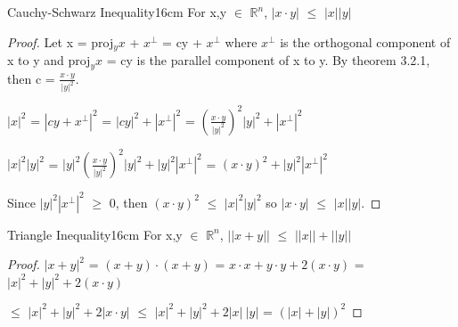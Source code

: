     \vspace{0.5cm}



    \begin{wtheorem}{Cauchy-Schwarz Inequality}{16cm}
        For x,y $\in$ $\mathbb{R}^n$,
        $|x \cdot y|$ $\leq$ $|x| |y|$
    \end{wtheorem}

    \begin{proof}
        Let x = proj$_yx$ + $x^{\perp}$ = cy + $x^{\perp}$
        where $x^{\perp}$ is the orthogonal component of x to y and
        proj$_yx$ = cy is the parallel component of x to y.
        By {\color{red} theorem 3.2.1}, then c = $\frac{x \cdot y}{|y|^2}$.

        \hspace{0.5cm}
        $|x|^2$
        = $|cy+x^{\perp}|^2$
        = $|cy|^2 + |x^{\perp}|^2$
        = $(\frac{x \cdot y}{|y|^2})^2 |y|^2 + |x^{\perp}|^2$

        \hspace{0.5cm}
        $|x|^2 |y|^2$
        = $|y|^2(\frac{x \cdot y}{|y|^2})^2 |y|^2 + |y|^2 |x^{\perp}|^2$
        = $(x \cdot y)^2 + |y|^2 |x^{\perp}|^2$

        Since $|y|^2 |x^{\perp}|^2$ $\geq$ 0, then
        $(x \cdot y)^2$ $\leq$ $|x|^2 |y|^2$
        so $|x \cdot y|$ $\leq$ $|x| |y|$.
    \end{proof}

    \vspace{0.5cm}



    \begin{corollary}{Triangle Inequality}{16cm}
        For x,y $\in$ $\mathbb{R}^n$,
        $||x+y||$ $\leq$ $||x|| + ||y||$
    \end{corollary}

    \begin{proof}
        $|x+y|^2$
        = $(x+y) \cdot (x+y)$
        = $x \cdot x + y \cdot y + 2(x \cdot y)$
        = $|x|^2 + |y|^2 +2(x \cdot y)$

        \hspace{1.35cm}
        $\leq$ $|x|^2 + |y|^2 +2|x \cdot y|$
        $\leq$ $|x|^2 + |y|^2 +2|x| \ |y|$
        = $(|x| + |y|)^2$
    \end{proof}

    \vspace{0.5cm}



